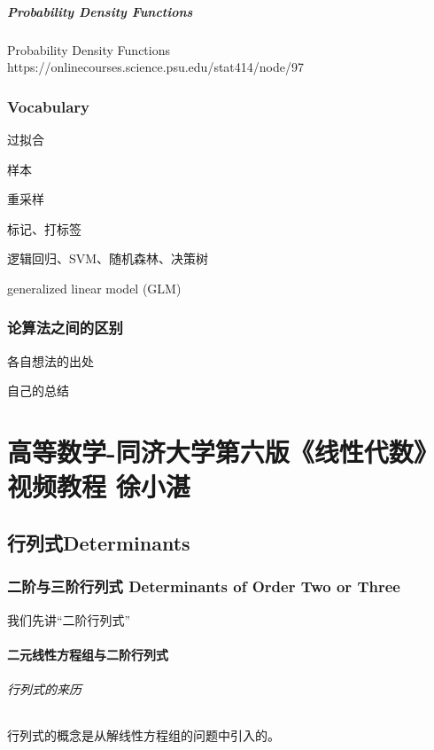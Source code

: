 \documentclass[UTF8]{ctexbook}
\begin{document}


\subsubsection{Probability Density Functions}

Probability Density Functions https://onlinecourses.science.psu.edu/stat414/node/97

\section{Vocabulary}

过拟合

样本

重采样

标记、打标签

逻辑回归、SVM、随机森林、决策树

generalized linear model (GLM)

\section{论算法之间的区别}

各自想法的出处

自己的总结

\part{高等数学-同济大学第六版《线性代数》视频教程 徐小湛}

\chapter{行列式Determinants}

\section{二阶与三阶行列式 Determinants of Order Two or Three}

我们先讲“二阶行列式”

\subsection{二元线性方程组与二阶行列式}

\paragraph{行列式的来历}行列式的概念是从解线性方程组的问题中引入的。
\end{document}
